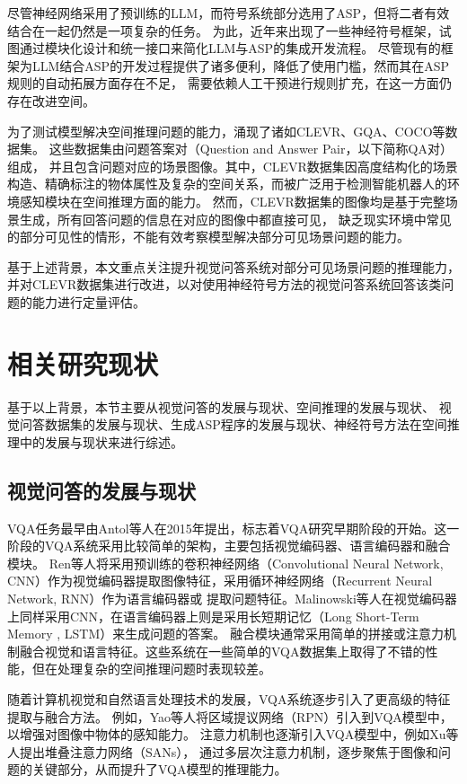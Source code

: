 尽管神经网络采用了预训练的LLM，而符号系统部分选用了ASP，但将二者有效结合在一起仍然是一项复杂的任务。
为此，近年来出现了一些神经符号框架，试图通过模块化设计和统一接口来简化LLM与ASP的集成开发流程\cite{wang2024dspybasedneuralsymbolicpipelineenhance}。
尽管现有的框架为LLM结合ASP的开发过程提供了诸多便利，降低了使用门槛，然而其在ASP规则的自动拓展方面存在不足，
需要依赖人工干预进行规则扩充，在这一方面仍存在改进空间。

为了测试模型解决空间推理问题的能力，涌现了诸如CLEVR、GQA、COCO等数据集。
这些数据集由问题答案对（Question and Answer Pair，以下简称QA对）组成，
并且包含问题对应的场景图像。其中，CLEVR数据集因高度结构化的场景构造、精确标注的物体属性及复杂的空间关系，而被广泛用于检测智能机器人的环境感知模块在空间推理方面的能力。
然而，CLEVR数据集的图像均是基于完整场景生成，所有回答问题的信息在对应的图像中都直接可见，
缺乏现实环境中常见的部分可见性的情形，不能有效考察模型解决部分可见场景问题的能力\cite{sam-abraham-etal-2024-clevr}。

基于上述背景，本文重点关注提升视觉问答系统对部分可见场景问题的推理能力，
并对CLEVR数据集进行改进，以对使用神经符号方法的视觉问答系统回答该类问题的能力进行定量评估。
\section{相关研究现状}
基于以上背景，本节主要从视觉问答的发展与现状、空间推理的发展与现状、
视觉问答数据集的发展与现状、生成ASP程序的发展与现状、神经符号方法在空间推理中的发展与现状来进行综述。

\subsection{视觉问答的发展与现状}
VQA任务最早由Antol\cite{Antol2015VQA}等人在2015年提出，标志着VQA研究早期阶段的开始。这一阶段的VQA系统采用比较简单的架构，主要包括视觉编码器、语言编码器和融合模块。
Ren\cite{ren2015exploring}等人将采用预训练的卷积神经网络（Convolutional Neural Network, CNN）作为视觉编码器提取图像特征，采用循环神经网络（Recurrent Neural Network, RNN）作为语言编码器或
提取问题特征。Malinowski\cite{malinowski2015neural}等人在视觉编码器上同样采用CNN，在语言编码器上则是采用长短期记忆（Long Short-Term Memory , LSTM）来生成问题的答案。
融合模块通常采用简单的拼接或注意力机制融合视觉和语言特征。这些系统在一些简单的VQA数据集上取得了不错的性能，但在处理复杂的空间推理问题时表现较差。

随着计算机视觉和自然语言处理技术的发展，VQA系统逐步引入了更高级的特征提取与融合方法。
例如，Yao\cite{lu2019look}等人将区域提议网络（RPN）引入到VQA模型中，以增强对图像中物体的感知能力。
注意力机制也逐渐引入VQA模型中，例如Xu\cite{xu2016stacked}等人提出堆叠注意力网络（SANs），
通过多层次注意力机制，逐步聚焦于图像和问题的关键部分，从而提升了VQA模型的推理能力。

